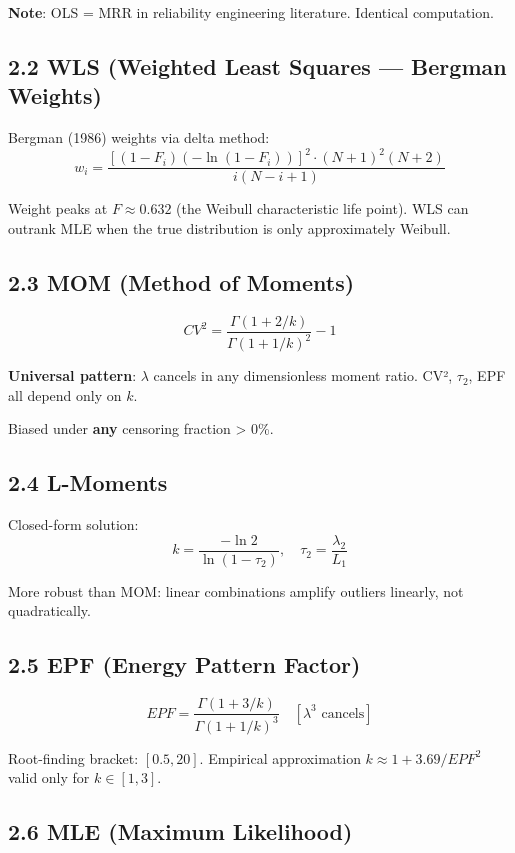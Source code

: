 \documentclass[
]{article}
\begin{document}
\textbf{Note}: OLS = MRR in reliability engineering literature.
Identical computation.

\subsection{2.2 WLS (Weighted Least Squares --- Bergman
Weights)}\label{wls-weighted-least-squares-bergman-weights}

Bergman (1986) weights via delta method:
\[w_i = \frac{[(1-F_i)(-\ln(1-F_i))]^2 \cdot (N+1)^2(N+2)}{i(N-i+1)}\]

Weight peaks at \(F \approx 0.632\) (the Weibull characteristic life
point). WLS can outrank MLE when the true distribution is only
approximately Weibull.

\subsection{2.3 MOM (Method of Moments)}\label{mom-method-of-moments}

\[CV^2 = \frac{\Gamma(1+2/k)}{\Gamma(1+1/k)^2} - 1\]

\textbf{Universal pattern}: \(\lambda\) cancels in any dimensionless
moment ratio. CV², \(\tau_2\), EPF all depend only on \(k\).

Biased under \textbf{any} censoring fraction \textgreater{} 0\%.

\subsection{2.4 L-Moments}\label{l-moments}

Closed-form solution:
\[k = \frac{-\ln 2}{\ln(1 - \tau_2)}, \quad \tau_2 = \frac{\lambda_2}{L_1}\]

More robust than MOM: linear combinations amplify outliers linearly, not
quadratically.

\subsection{2.5 EPF (Energy Pattern
Factor)}\label{epf-energy-pattern-factor}

\[EPF = \frac{\Gamma(1+3/k)}{\Gamma(1+1/k)^3} \quad [\lambda^3 \text{ cancels}]\]

Root-finding bracket: \([0.5, 20]\). Empirical approximation
\(k \approx 1 + 3.69/EPF^2\) valid only for \(k \in [1,3]\).

\subsection{2.6 MLE (Maximum Likelihood)}\label{mle-maximum-likelihood}
\end{document}
